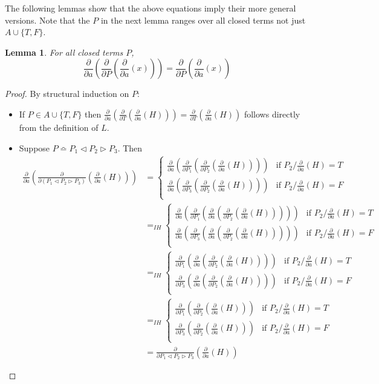 \documentclass[a4paper,twoside,openright]{report}
\newcommand{\dd}[1]{\frac{\partial}{\partial #1}}
\newcommand{\syn}{\bumpeq}
\newcommand{\lef}{\ensuremath{\triangleleft}}
\newcommand{\rig}{\ensuremath{\triangleright}}
\newtheorem{lem}[theorem]{Lemma}
\begin{document}
The following lemmas show that the above equations imply their more general versions. Note that the $P$ in the next lemma ranges over all closed terms not just $A\cup\{T,F\}$.

\begin{lem}\label{char lem one}
For all closed terms $P$,
\[
\dd a(\dd P(\dd a(x))) = \dd P(\dd a(x))
\]
\end{lem}
\begin{proof} By structural induction on $P$:
\begin{itemize}
\item If $P\in A\cup\{T,F\}$ then $\dd a(\dd T(\dd a(H)))=\dd T(\dd a(H))$ follows directly from the definition of $L$.
\item Suppose $P\syn P_1\lef P_2\rig P_3$. Then
\begin{align*}
\dd a(\dd{(P_1\lef P_2\rig P_3)}(\dd a(H)))
&=\begin{cases}
\dd a(\dd{P_1}(\dd{P_2}(\dd a(H)))) & \text{if $P_2/\dd a(H)=T$}\\
\dd a(\dd{P_3}(\dd{P_2}(\dd a(H)))) & \text{if $P_2/\dd a(H)=F$}\\
\end{cases}\\
&=_{IH}\begin{cases}
\dd a(\dd{P_1}(\dd a(\dd{P_2}(\dd a(H))))) & \text{if $P_2/\dd a(H)=T$}\\
\dd a(\dd{P_3}(\dd a(\dd{P_2}(\dd a(H))))) & \text{if $P_2/\dd a(H)=F$}\\
\end{cases}\\
&=_{IH}\begin{cases}
\dd{P_1}(\dd a(\dd{P_2}(\dd a(H)))) & \text{if $P_2/\dd a(H)=T$}\\
\dd{P_3}(\dd a(\dd{P_2}(\dd a(H)))) & \text{if $P_2/\dd a(H)=F$}\\
\end{cases}\\
&=_{IH}\begin{cases}
\dd{P_1}(\dd{P_2}(\dd a(H))) & \text{if $P_2/\dd a(H)=T$}\\
\dd{P_3}(\dd{P_2}(\dd a(H))) & \text{if $P_2/\dd a(H)=F$}\\
\end{cases}\\
&=\dd{P_1\lef P_2\rig P_3}(\dd a(H))
\end{align*}
\end{itemize}
\end{proof}
\end{document}
